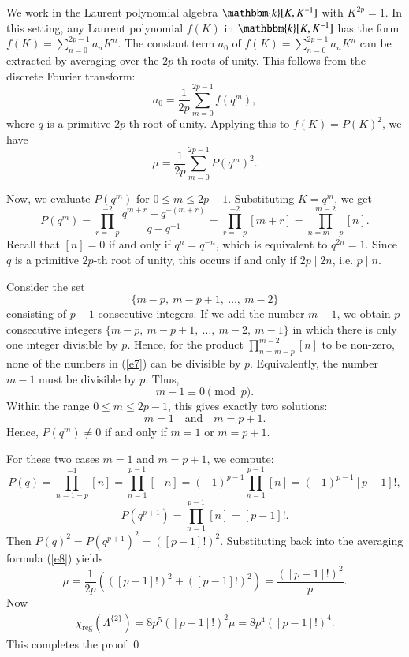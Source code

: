 \documentclass[11pt]{amsart}
\numberwithin{equation}{section}
\begin{document}
We work in the Laurent polynomial algebra \(\mathbbm{k}[K,K^{-1}]\) with \(K^{2p}=1\). In this setting, any Laurent polynomial $f(K)$ in \(\mathbbm{k}[K,K^{-1}]\) has the form \(f(K)=\sum_{n=0}^{2p-1} a_n K^n\).  The constant term $a_0$ of \(f(K)=\sum_{n=0}^{2p-1} a_n K^n\) can be extracted by averaging over the \(2p\)-th roots of unity. This follows from the discrete Fourier transform:
\[
a_0=\frac{1}{2p}\sum_{m=0}^{2p-1} f(q^m),
\]
where \(q\) is a primitive \(2p\)-th root of unity. Applying this to $f(K)=P(K)^2$, we have
\begin{equation}\label{e8}
\mu=\frac{1}{2p}\sum_{m=0}^{2p-1} P(q^m)^2.
\end{equation}

Now, we evaluate \(P(q^m)\) for  \(0 \le m \le 2p-1\). Substituting \(K=q^m\), we get
\[
P(q^m)=\prod_{r=-p}^{-2}\frac{q^{m+r}-q^{-(m+r)}}{q-q^{-1}}
=\prod_{r=-p}^{-2} [m+r]=\prod_{n=m-p}^{m-2} [n].
\]
Recall that \([n]=0\) if and only if \(q^n=q^{-n}\), which is equivalent to \(q^{2n}=1\). Since \(q\) is a  primitive \(2p\)-th root of unity, this occurs if and only if \(2p \mid 2n\), i.e. \(p \mid n\).

Consider the set
\begin{equation}\label{e7}
\{m-p,\ m-p+1,\ \dots,\ m-2\}
\end{equation}
consisting of \(p-1\) consecutive integers. If we add the number \(m-1\), we obtain \(p\) consecutive integers $\{m-p,\ m-p+1,\ \dots,\ m-2,\ m-1\}$ in which there is only one integer divisible by \(p\). Hence, for the product $\prod_{n=m-p}^{m-2} [n]$ to be non-zero, none of the numbers in (\ref{e7}) can be divisible by \(p\). Equivalently, the number $m-1$ must be divisible by \(p\). Thus,   
\[
m-1 \equiv 0 \pmod p.
\]
Within the range \(0 \le m \le 2p-1\), this gives exactly two solutions:
\[
m=1 \quad\text{and}\quad m=p+1.
\]
Hence, \(P(q^m)\neq0\) if and only if $m=1$ or $m=p+1$.

For these two cases $m=1$ and $m=p+1$, we compute:
$$
P(q) = \prod_{n=1-p}^{-1}[n] = \prod_{n=1}^{p-1}[-n] = (-1)^{p-1}\prod_{n=1}^{p-1}[n]= (-1)^{p-1}[p-1]!,
$$
$$
P(q^{p+1}) = \prod_{n=1}^{p-1}[n]=[p-1]!.
$$
Then \(P(q)^2=P(q^{p+1})^2 = ([p-1]!)^2\). Substituting back into the averaging formula (\ref{e8}) yields
\[
\mu = \frac{1}{2p}\left(([p-1]!)^2 + ([p-1]!)^2\right) = \frac{([p-1]!)^2}{p}.
\]
Now
\begin{align*}
\chi_{\operatorname{reg}}(\Lambda^{\{2\}})=8p^5([p-1]!)^2\mu=8p^4([p-1]!)^4.   
\end{align*}
This completes the proof
\qed
\end{document}
